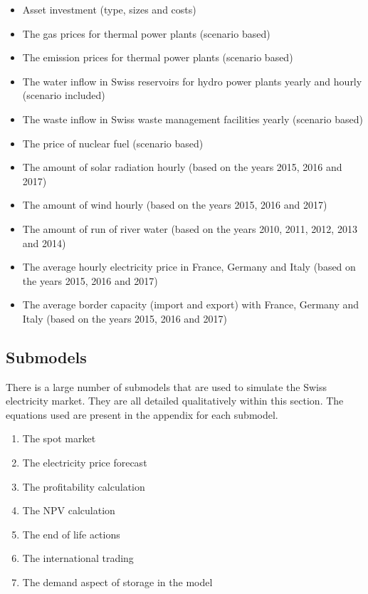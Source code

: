 \begin{itemize}
\item Asset investment (type, sizes and costs) 
\item The gas prices for thermal power plants (scenario based)
\item The emission prices for thermal power plants (scenario based)
\item The water inflow in Swiss reservoirs for hydro power plants yearly and hourly (scenario included)
\item The waste inflow in Swiss waste management facilities yearly (scenario based)
\item The price of nuclear fuel (scenario based)
\item The amount of solar radiation hourly (based on the years 2015, 2016 and 2017)
\item The amount of wind hourly (based on the years 2015, 2016 and 2017)
\item The amount of run of river water (based on the years 2010, 2011, 2012, 2013 and 2014)
\item The average hourly electricity price in France, Germany and Italy (based on the years 2015, 2016 and 2017)
\item The average border capacity (import and export) with France, Germany and Italy (based on the years 2015, 2016 and 2017)
\end{itemize}


\subsection{Submodels}
\label{sec:submodel}

There is a large number of submodels that are used to simulate the Swiss electricity market. They are all detailed qualitatively within this section. The equations used are present in the appendix for each submodel.

\begin{enumerate}
\item The spot market
\item The electricity price forecast
\item The profitability calculation
\item The NPV calculation
\item The end of life actions
\item The international trading
\item The demand aspect of storage in the model
\end{enumerate}

